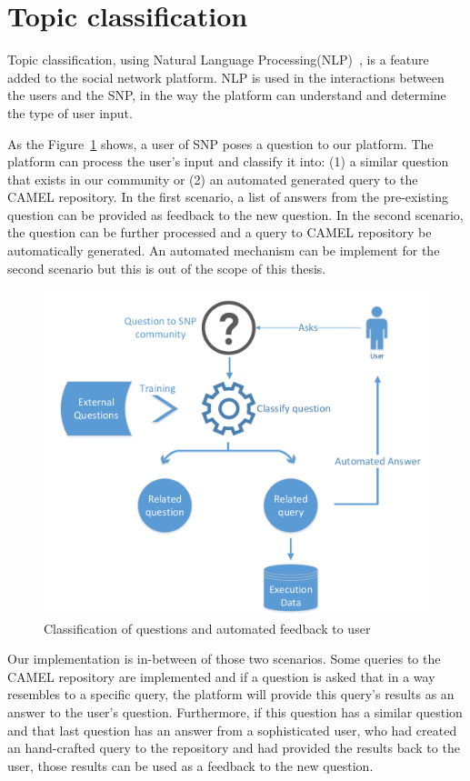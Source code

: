 \section{Topic classification}
\label{sec:natural_implementation}
Topic classification, using Natural Language Processing(NLP)~\cite{manning1999foundations}, is a feature added to the social network platform. NLP is used in the interactions between the users and the SNP, in the way the platform can understand and determine the type of user input. 

As the Figure~\ref{fig:auto_classification} shows, a user of SNP poses a question to our platform. The platform can process the user's input and classify it into: (1) a similar question that exists in our community or (2) an automated generated query to the CAMEL repository. In the first scenario, a list of answers from the pre-existing question can be provided as feedback to the new question. In the second scenario, the question can be further processed and a query to CAMEL repository be automatically generated. An automated mechanism can be implement for the second scenario but this is out of the scope of this thesis.  

\begin{figure}[h]
	\centering
	\includegraphics[width=1\textwidth]{./fig/Decision_making.pdf}
	\caption{Classification of questions and automated feedback to user}	
	\label{fig:auto_classification}
\end{figure}

Our implementation is in-between of those two scenarios. Some queries to the CAMEL repository are implemented and if a question is asked that in a way resembles to a specific query, the platform will provide this query's results as an answer to the user's question. Furthermore, if this question has a similar question and that last question has an answer from a sophisticated user, who had created an hand-crafted query to the repository and had provided the results back to the user, those results can be used as a feedback to the new question. 


